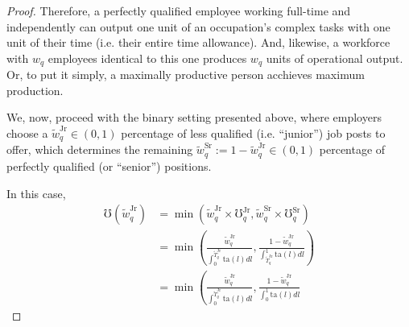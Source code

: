 \documentclass[hidelinks, nonatbib]{elsarticle}
\begin{document}
\begin{lemma}
\begin{proof}
        Therefore, a perfectly qualified employee working full-time and independently can output one unit of an occupation's complex tasks with one unit of their time (i.e. their entire time allowance). And, likewise, a workforce with $w_q$ employees identical to this one produces $w_q$ units of operational output. Or, to put it simply, a maximally productive person acchieves maximum production.
        
        We, now, proceed with the binary setting presented above, where employers choose a $\tilde{w}_{q}^{\text{Jr}} \in (0,1)$ percentage of less qualified (i.e. ``junior'') job posts to offer, which determines the remaining $\tilde{w}_{q}^{\text{Sr}} := 1 - \tilde{w}_{q}^{\text{Jr}} \in (0,1)$ percentage of perfectly qualified (or ``senior'') positions.
        
        In this case,
        \begin{align}
            \mho(\tilde{w}_{q}^{\text{Jr}})
            &=
            \min\left(
                \tilde{w}_{q}^{\text{Jr}}
                \times
                \mho_{q}^{\text{Jr}}
                ,
                \tilde{w}_{q}^{\text{Sr}}
                \times
                \mho_{q}^{\text{Sr}}
            \right)
            \\
            &=
            \min\left(
                \frac{
                    \tilde{w}_{q}^{\text{Jr}}
                }{
                    \int_{0}^{
                        \tilde{T}_{q}^{\text{Jr}}
                    }{
                        \text{ta}(l)
                        dl
                    }
                }
                ,
                \frac{
                    1 - \tilde{w}_{q}^{\text{Jr}}
                }{
                    \int_{
                        \tilde{T}_{q}^{\text{Jr}}
                    }^{1}{
                        \text{ta}(l)
                        dl
                    }
                }
            \right)
            \\
            &=
            \min\left(
                \frac{
                    \tilde{w}_{q}^{\text{Jr}}
                }{
                    \int_{0}^{
                        \tilde{T}_{q}^{\text{Jr}}
                    }{
                        \text{ta}(l)
                        dl
                    }
                }
                ,
                \frac{
                    1 - \tilde{w}_{q}^{\text{Jr}}
                }{
                    \int_{0}^{1}{
                        \text{ta}(l)
                        dl
                    }
}
\end{align}
\end{proof}
\end{lemma}
\end{document}

